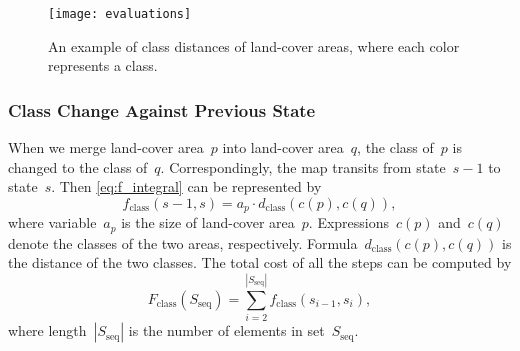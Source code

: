 \documentclass[ijgi,article,submit,moreauthors,pdftex]{Definitions/mdpi}
\begin{document}
\begin{figure*}[tb]
\centering
\texttt{[image: evaluations]}
\caption{An example of class distances of land-cover areas, 
    where each color represents a class.
}
\label{fig:evaluations_class_distance}
\end{figure*}






\subsubsection{Class Change Against Previous State}
\label{sec:class_change_previous}

When we merge land-cover area~$p$ into land-cover area~$q$,
the class of~$p$ is changed to the class of~$q$.
Correspondingly, the map transits from state~$s-1$ to state~$s$.
Then \eq\ref{eq:f_integral} can be represented by
\begin{equation}
\label{eq:f_to_previous}
f_\mathrm{class}({s-1},s)=a_p \cdot d_\mathrm{class}(c(p),c(q)),
\end{equation}
where variable~$a_p$ is the size of land-cover area~$p$. 
Expressions~$c(p)$ and~$c(q)$ denote the classes of the two areas, respectively.
Formula~$d_\mathrm{class}(c(p),c(q))$ is the distance of the two classes.
The total cost of all the steps can be computed by
\begin{equation}
\label{eq:F_to_previous}
F_\mathrm{class} (S_\mathrm{seq}) =
\sum\limits_{i=2}^{|S_\mathrm{seq}|} f_\mathrm{class}(s_{i-1},s_i),
\end{equation}
where length~$|S_\mathrm{seq}|$ is the number of elements in set~$S_\mathrm{seq}$.

%
%
%
\end{document}
